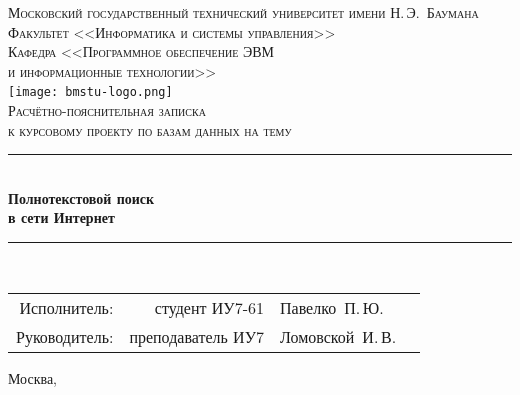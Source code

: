 \newcommand{\HRule}{\rule{\linewidth}{0.5mm}}

\begin{center}

\textsc{\large Московский государственный технический университет имени Н.\,Э.~Баумана}\\[0.5cm]
\textsc{Факультет <<Информатика и системы управления>>}\\
\textsc{Кафедра <<Программное обеспечение ЭВМ\\и информационные технологии>>}\\[0.25cm]

\texttt{[image: bmstu-logo.png]}~\\[2.25cm]

\textsc{\large Расчётно-пояснительная записка}\\
\textsc{к курсовому проекту по базам данных на тему}

\HRule \\[0.5cm]
{\huge \bfseries Полнотекстовой поиск\\в сети Интернет}

\HRule \\[0.5cm]

\vfill

\begin{flushright}
  \begin{tabular}{rrlc}
    Исполнитель:  &    студент ИУ7-61 & Павелко~П.\,Ю.  & \underline{\hspace{3cm}} \\[1cm]
    Руководитель: & преподаватель ИУ7 & Ломовской~И.\,В. & \underline{\hspace{3cm}} \\[1cm]
  \end{tabular}
\end{flushright}

{\large Москва, \the\year}

\end{center}

\newpage
{}
